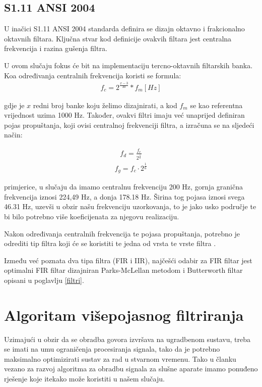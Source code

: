 \documentclass[times, utf8, diplomski]{fer}
\begin{document}
\section{S1.11 ANSI 2004}
U inačici S1.11 ANSI 2004 standarda definira se dizajn oktavno i frakcionalno oktavnih filtara. Ključna stvar kod definicije ovakvih filtara jest centralna frekvencija i razina gušenja filtra.

U ovom slučaju fokus će bit na implementaciju tercno-oktavnih filtarskih banka. Koa određivanja centralnih frekvencija koristi se formula:
\begin{equation}
\begin{aligned}
f_c = 2^\frac{x-3}{30}*f_m   [Hz]
\end{aligned}
\end{equation}

gdje je $x$ redni broj banke koju želimo dizajnirati, a kod $f_m$ se kao referentna vrijednost uzima 1000 Hz. Također, ovakvi filtri imaju već unaprijed definiran pojas propuštanja, koji ovisi centralnoj frekvenciji filtra, a izračuna se na sljedeći način:

\begin{equation}
\begin{aligned}
f_d = \frac{f_c}{2^\frac{1}{6}}
\end{aligned}
\end{equation}
\begin{equation}
\begin{aligned}
f_g = f_c \cdot 2^\frac{1}{6}
\end{aligned}
\end{equation}

primjerice, u slučaju da imamo centralnu frekvenciju 200 Hz, gornja granična frekvencija iznosi 224,49 Hz, a donja 178.18 Hz. Širina tog pojasa iznosi svega 46.31 Hz, uzevši u obzir našu frekvenciju uzorkovanja, to je jako usko područje te bi bilo potrebno više koeficijenata za njegovu realizaciju.

Nakon određivanja centralnih frekvencija te pojasa propuštanja, potrebno je odrediti tip filtra koji će se koristiti te jedna od vrsta te vrste filtra \citep{ansi2004}.

Između već poznata dva tipa filtra (FIR i IIR), najčešći odabir za FIR filtar jest optimalni FIR filtar dizajniran Parks-McLellan metodom i Butterworth filtar opisani u poglavlju \ref{filtri}.

\chapter{Algoritam višepojasnog filtriranja}
Uzimajući u obzir da se obradba govora izvršava na ugradbenom sustavu, treba se imati na umu ograničenja procesiranja signala, tako da je potrebno maksimalno optimizirati sustav za rad u stvarnom vremenu. Tako u članku vezano za razvoj algoritma za obradbu signala za slušne aparate imamo ponuđeno rješenje koje itekako može koristiti u našem slučaju.
\end{document}
